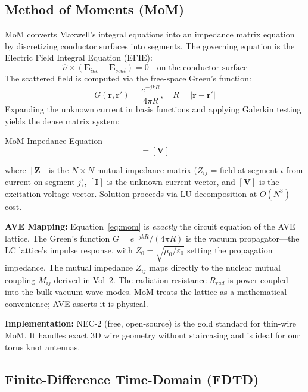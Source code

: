 \subsection{Method of Moments (MoM)}

MoM converts Maxwell's integral equations into an impedance matrix equation by discretizing conductor surfaces into segments. The governing equation is the Electric Field Integral Equation (EFIE):
\begin{equation}
    \hat{n} \times \left(\mathbf{E}_{inc} + \mathbf{E}_{scat}\right) = 0 \quad \text{on the conductor surface}
\end{equation}
The scattered field is computed via the free-space Green's function:
\begin{equation}
    G(\mathbf{r}, \mathbf{r}') = \frac{e^{-jkR}}{4\pi R}, \quad R = |\mathbf{r} - \mathbf{r}'|
\end{equation}
Expanding the unknown current in basis functions and applying Galerkin testing yields the dense matrix system:
\begin{resultbox}{MoM Impedance Equation}
\begin{equation}
    [\mathbf{Z}][\mathbf{I}] = [\mathbf{V}]
    \label{eq:mom}
\end{equation}
\end{resultbox}
where $[\mathbf{Z}]$ is the $N \times N$ mutual impedance matrix ($Z_{ij}$ = field at segment $i$ from current on segment $j$), $[\mathbf{I}]$ is the unknown current vector, and $[\mathbf{V}]$ is the excitation voltage vector. Solution proceeds via LU decomposition at $O(N^3)$ cost.

\textbf{AVE Mapping:} Equation~\ref{eq:mom} is \textit{exactly} the circuit equation of the AVE lattice. The Green's function $G = e^{-jkR}/(4\pi R)$ is the vacuum propagator---the LC lattice's impulse response, with $Z_0 = \sqrt{\mu_0/\varepsilon_0}$ setting the propagation impedance. The mutual impedance $Z_{ij}$ maps directly to the nuclear mutual coupling $M_{ij}$ derived in Vol~2. The radiation resistance $R_{rad}$ is power coupled into the bulk vacuum wave modes. MoM treats the lattice as a mathematical convenience; AVE asserts it is physical.

\textbf{Implementation:} NEC-2 (free, open-source) is the gold standard for thin-wire MoM. It handles exact 3D wire geometry without staircasing and is ideal for our torus knot antennas.

\subsection{Finite-Difference Time-Domain (FDTD)}


